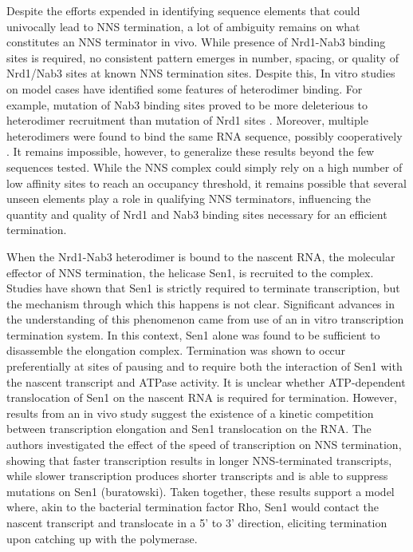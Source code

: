 Despite the efforts expended in identifying sequence elements that could univocally lead to NNS termination, a lot of ambiguity remains on what constitutes an NNS terminator in vivo. 
While presence of Nrd1-Nab3 binding sites is required, no consistent pattern emerges in number, spacing, or quality of Nrd1/Nab3 sites at known NNS termination sites. 
Despite this, In vitro studies on model cases have identified some features of heterodimer binding. 
For example, mutation of Nab3 binding sites proved to be more deleterious to heterodimer recruitment than mutation of Nrd1 sites \cite{carroll:2007:interaction}. 
Moreover, multiple heterodimers were found to bind the same RNA sequence, possibly cooperatively \cite{carroll:2007:interaction}. 
It remains impossible, however, to generalize these results beyond the few sequences tested. 
While the NNS complex could simply rely on a high number of low affinity sites to reach an occupancy threshold, it remains possible that several unseen elements play a role in qualifying NNS terminators, influencing the quantity and quality of Nrd1 and Nab3 binding sites necessary for an efficient termination.

When the Nrd1-Nab3 heterodimer is bound to the nascent RNA, the molecular effector of NNS termination, the helicase Sen1, is recruited to the complex. 
Studies have shown that Sen1 is strictly required to terminate transcription, but the mechanism through which this happens is not clear. 
Significant advances in the understanding of this phenomenon came from use of an in vitro transcription termination system. 
In this context, Sen1 alone was found to be sufficient to disassemble the elongation complex. Termination was shown to occur preferentially at sites of pausing and to require both the interaction of Sen1 with the nascent transcript and ATPase activity. 
It is unclear whether ATP-dependent translocation of Sen1 on the nascent RNA is required for termination. However, results from an in vivo study suggest the existence of a kinetic competition between transcription elongation and Sen1 translocation on the RNA. 
The authors investigated the effect of the speed of transcription on NNS termination, showing that faster transcription results in longer NNS-terminated transcripts, while slower transcription produces shorter transcripts and is able to suppress mutations on Sen1 (buratowski). 
Taken together, these results support a model where, akin to the bacterial termination factor Rho, Sen1 would contact the nascent transcript and translocate in a 5’ to 3’ direction, eliciting termination upon catching up with the polymerase.

